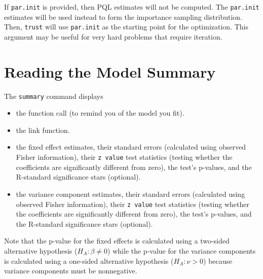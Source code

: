 \documentclass[11pt]{article}\usepackage[]{graphicx}\usepackage[]{color}
\begin{document}
If \texttt{par.init} is provided, then PQL estimates will not be computed. The \texttt{par.init} estimates will be used instead to form the importance sampling distribution. Then, \texttt{trust} will use \texttt{par.init} as the starting point for the optimization. This argument may be useful for very hard problems that require iteration.\\

\section{Reading the Model Summary}\label{sec:summary}

The \texttt{summary} command displays
\begin{itemize}
\item the function call (to remind you of the model you fit).
\item the link function.
\item the fixed effect estimates, their standard errors (calculated using observed Fisher information), their \texttt{z value} test statistics (testing whether the coefficients are significantly different from zero), the test's p-values, and the R-standard significance stars (optional).
\item the variance component estimates, their standard errors (calculated using observed Fisher information), their \texttt{z value} test statistics (testing whether the coefficients are significantly different from zero), the test's p-values, and the R-standard significance stars (optional).
\end{itemize}



Note that the p-value for the fixed effects is calculated using a two-sided alternative hypothesis ($H_A: \beta \neq 0$) while the p-value for the variance components is calculated using a one-sided alternative hypothesis ($H_A: \nu >0$) because variance components must be nonnegative.\\
\end{document}
